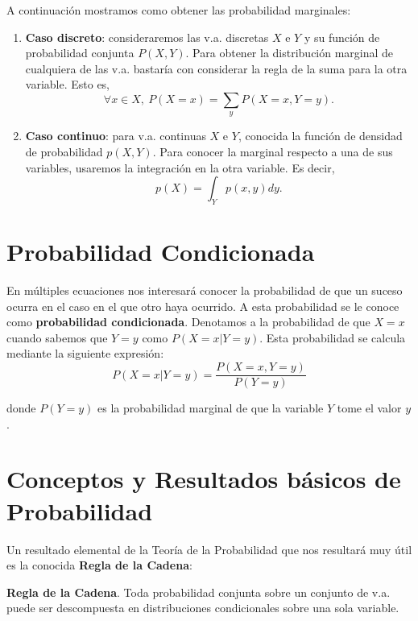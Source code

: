 A continuación mostramos como obtener las probabilidad marginales:
\begin{enumerate}
    \item \textbf{Caso discreto}: consideraremos las \ac{v.a.} discretas $X$ e $Y$ y su función de probabilidad conjunta $P(X,Y)$. Para obtener la distribución marginal de cualquiera de las \ac{v.a.} bastaría con considerar la regla de la suma para la otra variable. Esto es,
    \begin{equation}
        \forall x \in X,\ P(X=x)= \sum_y P(X=x, Y=y).
    \end{equation}

    \item \textbf{Caso continuo}: para \ac{v.a.} continuas $X$ e $Y$, conocida la función de densidad de probabilidad $p(X, Y)$. Para conocer la marginal respecto a una de sus variables, usaremos la integración en la otra variable. Es decir,
    \begin{equation}
        p(X) = \int_Y p(x, y)dy.
    \end{equation}
\end{enumerate}

\section{Probabilidad Condicionada}
En múltiples ecuaciones nos interesará conocer la probabilidad de que un suceso ocurra en el caso en el que otro haya ocurrido. A esta probabilidad se le conoce como \textbf{probabilidad condicionada}. Denotamos a la probabilidad de que $X=x$ cuando sabemos que $Y=y$ como $P(X=x|Y=y)$. Esta probabilidad se calcula mediante la siguiente expresión:
\begin{equation}
    P(X=x|Y=y) = \frac{P(X=x,Y=y)}{P(Y=y)}
\end{equation}

donde $P(Y=y)$ es la probabilidad marginal de que la variable $Y$ tome el valor $y$.

\section{Conceptos y Resultados básicos de Probabilidad}
Un resultado elemental de la Teoría de la Probabilidad que nos resultará muy útil es la conocida \textbf{Regla de la Cadena}:
\begin{proposition}
    \textbf{Regla de la Cadena}. Toda probabilidad conjunta sobre un conjunto de \ac{v.a.} puede ser descompuesta en distribuciones condicionales sobre una sola variable.
\end{proposition}

